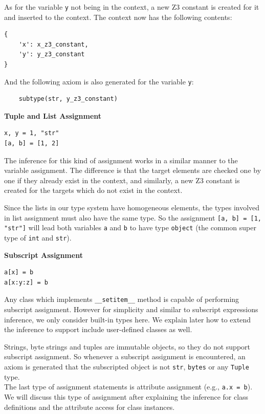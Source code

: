 As for the variable \lstinline|y| not being in the context, a new Z3 constant is created for it and inserted to the context. The context now has the following contents:
\begin{lstlisting}
{
	'x': x_z3_constant,
	'y': y_z3_constant
}
\end{lstlisting}

And the following axiom is also generated for the variable \lstinline|y|:
\begin{lstlisting}
	subtype(str, y_z3_constant)
\end{lstlisting}

\textbf{Tuple and List Assignment}
\begin{lstlisting}
x, y = 1, "str"
[a, b] = [1, 2]
\end{lstlisting}

The inference for this kind of assignment works in a similar manner to the variable assignment. The difference is that the target elements are checked one by one if they already exist in the context, and similarly, a new Z3 constant is created for the targets which do not exist in the context.

Since the lists in our type system have homogeneous elements, the types involved in list assignment must also have the same type. So the assignment \lstinline|[a, b] = [1, "str"]| will lead both variables \lstinline|a| and \lstinline|b| to have type \lstinline|object| (the common super type of \lstinline|int| and \lstinline|str|).

\textbf{Subscript Assignment}
\begin{lstlisting}
a[x] = b
a[x:y:z] = b
\end{lstlisting}

Any class which implements \lstinline|__setitem__| method is capable of performing subscript assignment. However for simplicity and similar to subscript expressions inference, we only consider built-in types here. We explain later how to extend the inference to support include user-defined classes as well.

Strings, byte strings and tuples are immutable objects, so they do not support subscript assignment. So whenever a subscript assignment is encountered, an axiom is generated that the subscripted object is not \lstinline|str|, \lstinline|bytes| or any \lstinline|Tuple| type.\\

The last type of assignment statements is attribute assignment (e.g., \lstinline|a.x = b|). We will discuss this type of assignment after explaining the inference for class definitions and the attribute access for class instances.\\

